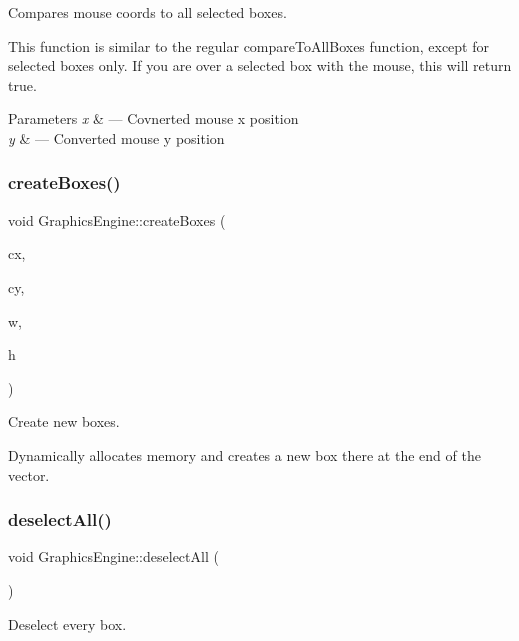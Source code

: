 Compares mouse coords to all selected boxes. 

This function is similar to the regular compare\+To\+All\+Boxes function, except for selected boxes only. If you are over a selected box with the mouse, this will return true.


\begin{DoxyParams}{Parameters}
{\em x} & --- Covnerted mouse x position \\
\hline
{\em y} & --- Converted mouse y position \\
\hline
\end{DoxyParams}
\mbox{\label{class_graphics_engine_adf448561f5df07f42050cb0f5483eacd}} 
\subsubsection{\texorpdfstring{create\+Boxes()}{createBoxes()}}
{\footnotesize\ttfamily void Graphics\+Engine\+::create\+Boxes (\begin{DoxyParamCaption}\item[{G\+Lfloat}]{cx,  }\item[{G\+Lfloat}]{cy,  }\item[{G\+Lfloat}]{w,  }\item[{G\+Lfloat}]{h }\end{DoxyParamCaption})}



Create new boxes. 

Dynamically allocates memory and creates a new box there at the end of the vector. \mbox{\label{class_graphics_engine_aa786a083387002aa1445026627a51b0a}} 
\subsubsection{\texorpdfstring{deselect\+All()}{deselectAll()}}
{\footnotesize\ttfamily void Graphics\+Engine\+::deselect\+All (\begin{DoxyParamCaption}{ }\end{DoxyParamCaption})}



Deselect every box. 

